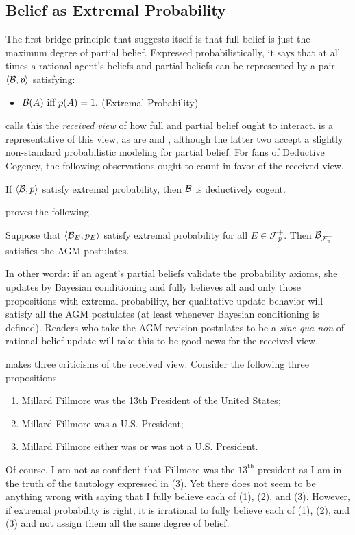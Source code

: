   \subsection{Belief as Extremal Probability}
The first bridge principle that suggests itself is that full belief is just the
maximum degree of partial belief. Expressed probabilistically, it says that at
all times a rational agent's beliefs and partial beliefs can be represented by a
pair $\langle \mathcal{B},p \rangle$ satisfying:

\begin{itemize}
\item[] $\mathcal{B}(A) \text{ iff } p(A)=1.$ \hfill (Extremal Probability)
\end{itemize}
\citet{roorda1995wolfman} calls this the {\em received view} of how full and
partial belief ought to interact. \citet{gardenfors1986dynamics} is a
representative of this view, as are \citet{van1995fine} and
\citet{arlo1999qualitative}, although the latter two accept a slightly
non-standard probabilistic modeling for partial belief. For fans of Deductive
Cogency, the following observations  ought to count in favor of the received
view.
\begin{theorem}
If $\langle \mathcal{B}, p \rangle$ satisfy extremal probability, then $\mathcal{B}$ is
deductively cogent.
  \end{theorem}
\citet{gardenfors1986dynamics} proves the following. 
\begin{theorem}
   Suppose that $\langle \mathcal{B}_E, p_E \rangle$ satisfy extremal probability for
   all $E\in \mathcal{F}_p^+.$  Then $\mathcal{B}_{\mathcal{F}_p^+}$  satisfies the AGM
   postulates. 
\end{theorem}
In other words: if an agent's partial beliefs validate the probability axioms,
she updates by Bayesian conditioning and fully believes all and only those
propositions with extremal probability, her qualitative update behavior will
satisfy all the AGM postulates (at least whenever Bayesian conditioning is
defined). Readers who take the AGM revision postulates to be a {\em sine qua
non} of rational belief update will take this to be good news for the received
view. 

\citet{roorda1995wolfman} makes three criticisms of the received view. Consider
the following three propositions.
\begin{enumerate}
\item Millard Fillmore was the 13th President of the United States;
\item Millard Fillmore was a U.S. President;
\item Millard Fillmore either was or was not a U.S. President. 
\end{enumerate}
Of course, I am not as confident that Fillmore was the $13^\text{th}$ president
as I am in the truth of the tautology expressed in (3). Yet there does not seem
to be anything wrong with saying that I fully believe each of (1), (2), and (3).
However, if extremal probability is right, it is irrational to fully believe
each of (1), (2), and (3) and not assign them all the same degree of belief.

